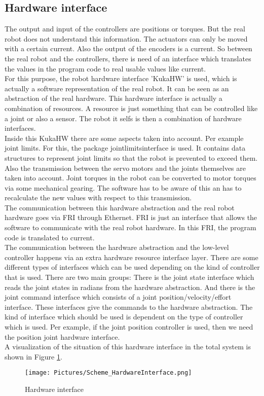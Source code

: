 \documentclass[11pt,a4paper]{report}
\begin{document}
\subsection{Hardware interface}\label{HardwareInterface}
The output and input of the controllers are positions or torques. But the real robot does not understand this information. The actuators can only be moved with a certain current. Also the output of the encoders is a current. So between the real robot and the controllers, there is need of an interface which translates the values in the program code to real usable values like current.\\For this purpose, the robot hardware interface 'KukaHW' is used, which is actually a software representation of the real robot. It can be seen as an abstraction of the real hardware. This hardware interface is actually a combination of resources. A resource is just something that can be controlled like a joint or also a sensor. The robot it selfs is then a combination of hardware interfaces.\\
Inside this KukaHW there are some aspects taken into account. Per example joint limits. For this, the package joint\textunderscore limits\textunderscore interface is used. It contains data structures to represent joint limits so that the robot is prevented to exceed them. Also the transmission between the servo motors and the joints themselves are taken into account. Joint torques in the robot can be converted to motor torques via some mechanical gearing. The software has to be aware of this an has to recalculate the new values with respect to this transmission.\\
The communication between this hardware abstraction and the real robot hardware goes via FRI through Ethernet. FRI is just an interface that allows the software to communicate with the real robot hardware. In this FRI, the program code is translated to current.\\ The communication between the hardware abstraction and the low-level controller happens via an extra hardware resource interface layer. There are some different types of interfaces which can be used depending on the kind of controller that is used. There are two main groups: There is the joint state interface which reads the joint states in radians from the hardware abstraction. And there is the joint command interface which consists of a joint position/velocity/effort interface. These interfaces give the commands to the hardware abstraction. The kind of interface which should be used is dependent on the type of controller which is used. Per example, if the joint position controller is used, then we need the position joint hardware interface.\\
A visualization of the situation of this hardware interface in the total system is shown in Figure \ref{fig:HardwareInterface}.
\begin{figure}[!ht]
	\centering
	\texttt{[image: Pictures/Scheme\_HardwareInterface.png]}
	\caption{Hardware interface}
	\label{fig:HardwareInterface}
\end{figure}
\newpage
\end{document}
